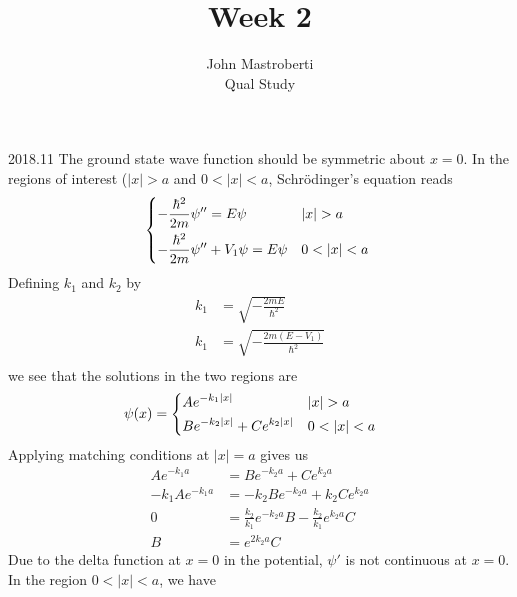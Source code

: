\documentclass[12pt]{article}
\begin{document}
\title{Week 2}
\author{John Mastroberti\\
Qual Study}

\maketitle

\begin{solution}{2018.11}
The ground state wave function should be symmetric about $x=0$.
In the regions of interest ($\left| x \right| > a$ and $0 < \left| x \right| < a$,
Schr\"{o}dinger's equation reads
\begin{align*}
\begin{dcases*}
-\frac{\hbar^2}{2m} \psi'' = E \psi & $\left| x \right| > a$ \\
-\frac{\hbar^2}{2m} \psi'' + V_1 \psi = E \psi & $0 < \left| x \right| < a$ \\
\end{dcases*}
\end{align*}
Defining $k_1$ and $k_2$ by
\begin{align*}
k_1 & = \sqrt{ -\frac{2mE}{\hbar^2}} \\
k_1 & = \sqrt{ -\frac{2m(E-V_1)}{\hbar^2}} \\
\end{align*}
we see that the solutions in the two regions are
\begin{align*}
\psi(x) & = \begin{dcases*}
A e^{-k_1 \left| x \right|} & $\left| x \right| > a$ \\
B e^{-k_2 \left| x \right|} + C e^{k_2 \left| x \right|} & $0 < \left| x \right| < a$ \\
\end{dcases*}
\end{align*}
Applying matching conditions at $\left| x \right| = a$ gives us
\begin{align*}
A e^{-k_1 a} & = B e^{-k_2 a} + C e^{k_2 a} \\
-k_1 A e^{-k_1 a} & = -k_2 B e^{-k_2 a} + k_2 C e^{k_2 a} \\
0 & = \frac{k_2}{k_1} e^{-k_2 a} B - \frac{k_2}{k_1} e^{k_2 a} C \\
B & = e^{2k_2 a} C
\end{align*}
Due to the delta function at $x=0$ in the potential, $\psi'$ is not continuous at $x=0$.
In the region $0 < \left| x \right| < a$, we have
\begin{align*}

\end{align*}
\end{solution}
\end{document}

